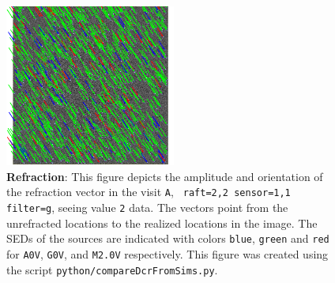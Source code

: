 \documentclass[DM,toc]{lsstdoc}
\def\A{{\tt A}}
\begin{document}
\begin{figure}[!ht]
  \centering
  \includegraphics[width=0.5\textwidth]{outputs8bCA_g_doPreConvolveFalse_refract_crop.png}
  \caption{{\bf Refraction}: This figure depicts the amplitude and
    orientation of the refraction vector in the visit \A, {\tt
      raft=2,2 sensor=1,1 filter=g}, seeing value {\tt 2} data.  The
    vectors point from the unrefracted locations to the realized
    locations in the image.  The SEDs of the sources are indicated
    with colors {\tt blue}, {\tt green} and {\tt red} for {\tt A0V},
    {\tt G0V}, and {\tt M2.0V} respectively.  This figure was created
    using the script {\tt python/compareDcrFromSims.py}.}
  \label{fig:refractim}
\end{figure}
\end{document}
